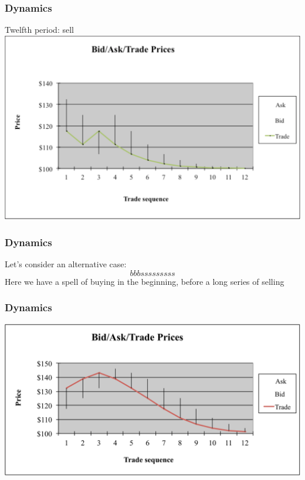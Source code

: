 \begin{frame} [noframenumbering]
	\frametitle{Dynamics}
	Twelfth period: sell
	\center
	\includegraphics[width=0.9\linewidth]{pics/P12_Image.pdf}
\end{frame}


\begin{frame} [noframenumbering]
	\frametitle{Dynamics}
	Let's consider an alternative case:
	\[
	bbbsssssssss
	\]
	Here we have a spell of buying in the beginning, before a long series of selling
\end{frame}


\begin{frame} [noframenumbering]
	\frametitle{Dynamics}
	\includegraphics[width=1\linewidth]{pics/Bubble_Image.pdf}
	\hyperlink{example}{}
\end{frame}


 